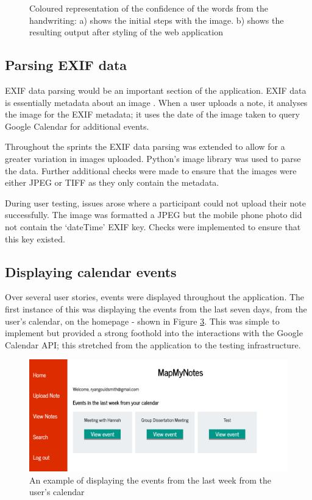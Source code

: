 {{{{{{{\begin{figure}[H]
\begin{subfigure}[h]{0.35\textwidth}
    \caption{}
    \label{fig:second_tesseract}
  \end{subfigure}
  \caption{Coloured representation of the confidence of the words from the handwriting: a) shows the initial steps with the image. b) shows the resulting output after styling of the web application}
  \label{fig:tesseract_colour}

\end{figure}

\subsection{Parsing EXIF data}
EXIF data parsing would be an important section of the application. EXIF data is essentially metadata about an image \cite{citeulike:14024991}. When a user uploads a note, it analyses the image for the EXIF metadata; it  uses the date of the image taken to query Google Calendar for additional events.

Throughout the sprints the EXIF data parsing was extended to allow for a greater variation in images uploaded. Python's image library \cite{citeulike:14024992} was used to parse the data. Further additional checks were made to ensure that the images were either JPEG or TIFF as they only contain the metadata.

During user testing, issues arose where a participant could not upload their note successfully. The image was formatted a JPEG but the mobile phone photo did not contain the `dateTime' EXIF key. Checks were implemented to ensure that this key existed.

\subsection{Displaying calendar events}
Over several user stories, events were displayed throughout the application. The first instance of this was displaying the events from the last seven days, from the user's calendar, on the homepage - shown in Figure \ref{fig:seven_days}. This was simple to implement but provided a strong foothold into the interactions with the Google Calendar API; this stretched from the application to the testing infrastructure.

\begin{figure}[H]
  \centering
  \includegraphics[scale=0.5]{images/event_seven_day}
  \caption{An example of displaying the events from the last week from the user's calendar}
  \label{fig:seven_days}
\end{figure}

}}}}}}}
